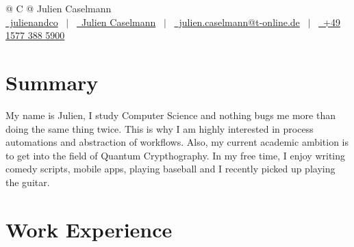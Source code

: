 \documentclass[a4paper,12pt]{article}
\begin{document}
\pagestyle{empty} 



\begin{tabularx}{\linewidth}{@{} C @{}}
\Huge{Julien Caselmann} \\[7.5pt]
\href{https://github.com/julienandco}{\raisebox{-0.05\height}\faGithub\ julienandco} \ $|$ \ 
\href{https://www.linkedin.com/in/julien-caselmann-761a2b177/}{\raisebox{-0.05\height}\faLinkedin\ Julien Caselmann} \ $|$ \ 
\href{mailto:julien.caselmann@t-online.de}{\raisebox{-0.05\height}\faEnvelope \ julien.caselmann@t-online.de} \ $|$ \ 
\href{tel:+4915773885900}{\raisebox{-0.05\height}\faMobile \ +49 1577 388 5900} \\
\end{tabularx}


\section{Summary}
My name is Julien, I study Computer Science and nothing bugs me more than doing the same thing twice. This is why I am highly interested in process automations and abstraction of workflows. Also, my current academic ambition is to
get into the field of Quantum Crypthography. In my free time, I enjoy writing comedy scripts, mobile apps, playing baseball and I recently picked up playing the guitar.

\section{Work Experience}
\end{document}

